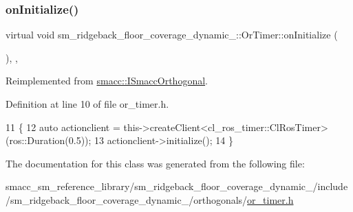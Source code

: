 \subsubsection{\texorpdfstring{on\+Initialize()}{onInitialize()}}
{\footnotesize\ttfamily virtual void sm\+\_\+ridgeback\+\_\+floor\+\_\+coverage\+\_\+dynamic\+\_\+::\+Or\+Timer\+::on\+Initialize (\begin{DoxyParamCaption}{ }\end{DoxyParamCaption})\hspace{0.3cm}{\ttfamily [inline]}, {\ttfamily [override]}, {\ttfamily [virtual]}}



Reimplemented from \hyperlink{classsmacc_1_1ISmaccOrthogonal_a6bb31c620cb64dd7b8417f8705c79c7a}{smacc\+::\+I\+Smacc\+Orthogonal}.



Definition at line 10 of file or\+\_\+timer.\+h.


\begin{DoxyCode}
11     \{
12         \textcolor{keyword}{auto} actionclient = this->createClient<cl\_ros\_timer::ClRosTimer>(ros::Duration(0.5));
13         actionclient->initialize();
14     \}
\end{DoxyCode}


The documentation for this class was generated from the following file\+:\begin{DoxyCompactItemize}
\item 
smacc\+\_\+sm\+\_\+reference\+\_\+library/sm\+\_\+ridgeback\+\_\+floor\+\_\+coverage\+\_\+dynamic\+\_/include/sm\+\_\+ridgeback\+\_\+floor\+\_\+coverage\+\_\+dynamic\+\_/orthogonals/\hyperlink{sm__ridgeback__floor__coverage__dynamic__1_2include_2sm__ridgeback__floor__coverage__dynamic__1_2orthogonals_2or__timer_8h}{or\+\_\+timer.\+h}\end{DoxyCompactItemize}
